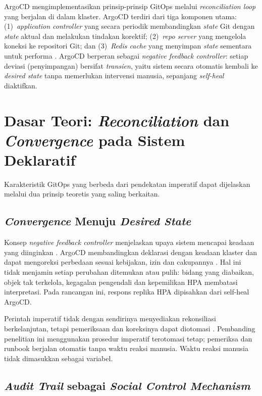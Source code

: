 ArgoCD mengimplementasikan prinsip-prinsip GitOps melalui \textit{reconciliation loop} yang berjalan di dalam klaster. ArgoCD terdiri dari tiga komponen utama: (1)~\textit{application controller} yang secara periodik membandingkan \textit{state} Git dengan \textit{state} aktual dan melakukan tindakan korektif; (2)~\textit{repo server} yang mengelola koneksi ke repositori Git; dan (3)~\textit{Redis cache} yang menyimpan \textit{state} sementara untuk performa \citep{argocd2024}. ArgoCD berperan sebagai \textit{negative feedback controller}: setiap deviasi (penyimpangan) bersifat \textit{transien}, yaitu sistem secara otomatis kembali ke \textit{desired state} tanpa memerlukan intervensi manusia, sepanjang \textit{self-heal} diaktifkan.

\section{Dasar Teori: \textit{Reconciliation} dan \textit{Convergence} pada Sistem Deklaratif}

Karakteristik GitOps yang berbeda dari pendekatan imperatif dapat dijelaskan melalui dua prinsip teoretis yang saling berkaitan.

\subsection{\textit{Convergence} Menuju \textit{Desired State}}

Konsep \textit{negative feedback controller} menjelaskan upaya sistem mencapai keadaan yang diinginkan \citep{limoncelli2018}. ArgoCD membandingkan deklarasi dengan keadaan klaster dan dapat mengoreksi perbedaan sesuai kebijakan, izin dan cakupannya \citep{argocd2024,hassan2024reconciliation}. Hal ini tidak menjamin setiap perubahan ditemukan atau pulih: bidang yang diabaikan, objek tak terkelola, kegagalan pengendali dan kepemilikan HPA membatasi interpretasi. Pada rancangan ini, respons replika HPA dipisahkan dari self-heal ArgoCD.

Perintah imperatif tidak dengan sendirinya menyediakan rekonsiliasi berkelanjutan, tetapi pemeriksaan dan koreksinya dapat diotomasi \citep{hassan2024reconciliation,rahman2020gang}. Pembanding penelitian ini menggunakan prosedur imperatif terotomasi tetap; pemeriksa dan runbook berjalan otomatis tanpa waktu reaksi manusia. Waktu reaksi manusia tidak dimasukkan sebagai variabel.

\subsection{\textit{Audit Trail} sebagai \textit{Social Control Mechanism}}

